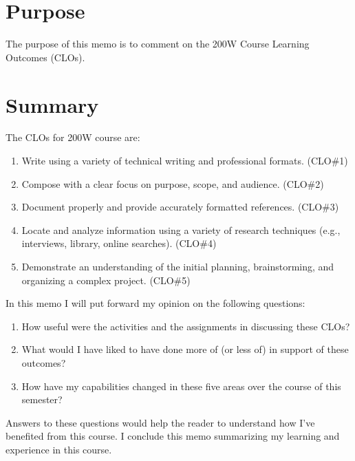 \documentclass[letterpaper,12pt]{texMemo}
\begin{document}
\begin{singlespacing}

\section*{Purpose}
The purpose of this memo is to comment on the 200W Course Learning Outcomes (CLOs).



\section*{Summary}
The CLOs for 200W course are:
\begin{enumerate}
        \item Write using a variety of technical writing and professional formats. (CLO\#1)
        \item Compose with a clear focus on purpose, scope, and audience. (CLO\#2)
        \item Document properly and provide accurately formatted references. (CLO\#3)
        \item Locate and analyze information using a variety of research techniques (e.g., interviews, library, online searches). (CLO\#4)
        \item Demonstrate an understanding of the initial planning, brainstorming, and organizing a complex project. (CLO\#5)
\end{enumerate}
In this memo I will put forward my opinion on the following questions:
\begin{enumerate}
        \item How useful were the activities and the assignments in discussing these CLOs?
        \item What would I have liked to have done more of (or less of) in support of these outcomes?
        \item How have my capabilities changed in these five areas over the course of this semester?
\end{enumerate}
Answers to these questions would help the reader to understand how I've benefited from this course. I conclude this memo summarizing my learning and experience in this course.


\end{singlespacing}
\end{document}
